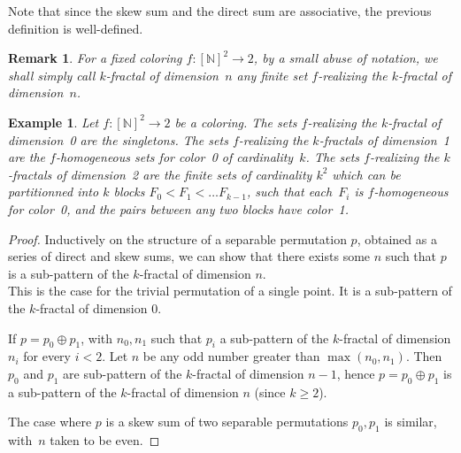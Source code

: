 \documentclass{article}
\numberwithin{theorem}{section}
\newtheorem{proposition}[theorem]{Proposition}
\newtheorem{remark}[theorem]{Remark}
\newtheorem{example}[theorem]{Example}
\newcommand{\quentin}[1]{\textcolor{green}{#1}}
\def\F{\mathcal{F}}
\newcommand{\NN}[0]{\mathbb{N}}
\begin{document}
Note that since the skew sum and the direct sum are associative, the previous definition is well-defined.

\begin{remark}
For a fixed coloring $f : [\NN]^2 \to 2$, by a small abuse of notation, we shall simply call \emph{$k$-fractal of dimension~$n$} any finite set $f$-realizing the $k$-fractal of dimension~$n$.
\end{remark}

\begin{example}
Let $f : [\NN]^2 \to 2$ be a coloring. The sets $f$-realizing the $k$-fractal of dimension~0 are the singletons.
The sets $f$-realizing the $k$-fractals of dimension~1 are the $f$-homogeneous sets for color~0 of cardinality~$k$. The sets $f$-realizing the $k$-fractals of dimension~2 are the finite sets of cardinality $k^2$ which can be partitionned into $k$ blocks $F_0 < F_1 < \dots F_{k-1}$, such that each~$F_i$ is $f$-homogeneous for color~0, and the pairs between any two blocks have color~1.
\end{example}


\begin{proof}
Inductively on the structure of a separable permutation $p$, obtained as a series of direct and skew sums, we can show that there exists some $n$ such that $p$ is a sub-pattern of the $k$-fractal of dimension $n$. \\

This is the case for the trivial permutation of a single point. It is a sub-pattern of the $k$-fractal of dimension $0$.

If $p = p_0 \oplus p_1$, with $n_0,n_1$ such that $p_i$ a sub-pattern of the $k$-fractal of dimension $n_i$ for every $i < 2$. Let $n$ be any odd number greater than $\max(n_0,n_1)$. Then $p_0$ and $p_1$ are sub-pattern of the $k$-fractal of dimension $n-1$, hence $p = p_0 \oplus p_1$ is a sub-pattern of the $k$-fractal of dimension $n$ (since $k \geq 2$).

The case where $p$ is a skew sum of two separable permutations $p_0, p_1$ is similar, with~$n$ taken to be even.
\end{proof}
\end{document}
